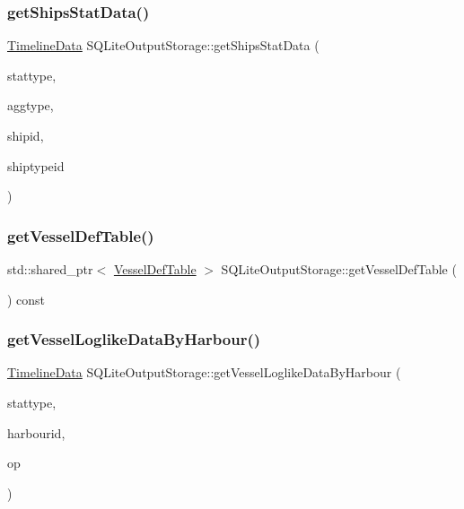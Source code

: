 \subsubsection{\texorpdfstring{getShipsStatData()}{getShipsStatData()}}
{\footnotesize\ttfamily \mbox{\hyperlink{struct_timeline_data}{Timeline\+Data}} S\+Q\+Lite\+Output\+Storage\+::get\+Ships\+Stat\+Data (\begin{DoxyParamCaption}\item[{\mbox{\hyperlink{namespacedisplace_1_1plot_a8c50b4d54cafba744b1b5b51b53407e0}{displace\+::plot\+::\+Ships\+Stat}}}]{stattype,  }\item[{\mbox{\hyperlink{namespacedisplace_1_1plot_a522cdc3da3faefae0803944b866e0c3d}{displace\+::plot\+::\+Aggregation\+Type}}}]{aggtype,  }\item[{int}]{shipid,  }\item[{std\+::vector$<$ int $>$}]{shiptypeid }\end{DoxyParamCaption})}

\mbox{\label{class_s_q_lite_output_storage_a9d5775767c84794b9963301844d8177d}} 
\subsubsection{\texorpdfstring{getVesselDefTable()}{getVesselDefTable()}}
{\footnotesize\ttfamily std\+::shared\+\_\+ptr$<$ \mbox{\hyperlink{class_vessel_def_table}{Vessel\+Def\+Table}} $>$ S\+Q\+Lite\+Output\+Storage\+::get\+Vessel\+Def\+Table (\begin{DoxyParamCaption}{ }\end{DoxyParamCaption}) const}

\mbox{\label{class_s_q_lite_output_storage_a41abcf70b12fcc6762558afbec357f9e}} 
\subsubsection{\texorpdfstring{getVesselLoglikeDataByHarbour()}{getVesselLoglikeDataByHarbour()}}
{\footnotesize\ttfamily \mbox{\hyperlink{struct_timeline_data}{Timeline\+Data}} S\+Q\+Lite\+Output\+Storage\+::get\+Vessel\+Loglike\+Data\+By\+Harbour (\begin{DoxyParamCaption}\item[{\mbox{\hyperlink{namespacedisplace_1_1plot_a006fcde9bb7e602d977226ff75cb67aa}{displace\+::plot\+::\+Harbours\+Stat}}}]{stattype,  }\item[{int}]{harbourid,  }\item[{\mbox{\hyperlink{class_s_q_lite_output_storage_aa3928d8e7ab04aafef854a63a94222eb}{Operation}}}]{op }\end{DoxyParamCaption})}

